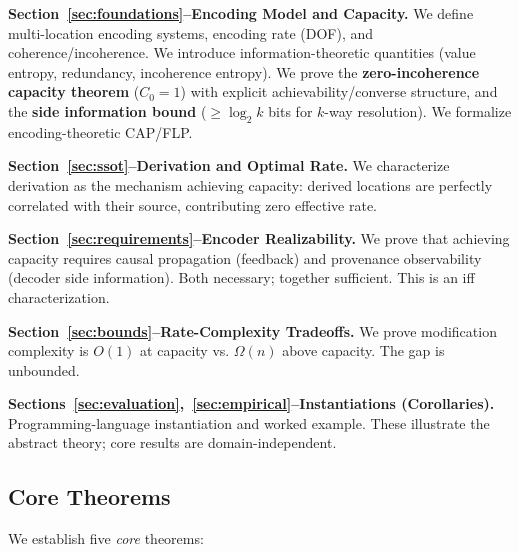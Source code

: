 \textbf{Section~\ref{sec:foundations}--Encoding Model and Capacity.} We define multi-location encoding systems, encoding rate (DOF), and coherence/incoherence. We introduce information-theoretic quantities (value entropy, redundancy, incoherence entropy). We prove the \textbf{zero-incoherence capacity theorem} ($C_0 = 1$) with explicit achievability/converse structure, and the \textbf{side information bound} ($\geq \log_2 k$ bits for $k$-way resolution). We formalize encoding-theoretic CAP/FLP.

\textbf{Section~\ref{sec:ssot}--Derivation and Optimal Rate.} We characterize derivation as the mechanism achieving capacity: derived locations are perfectly correlated with their source, contributing zero effective rate.

\textbf{Section~\ref{sec:requirements}--Encoder Realizability.} We prove that achieving capacity requires causal propagation (feedback) and provenance observability (decoder side information). Both necessary; together sufficient. This is an iff characterization.

\textbf{Section~\ref{sec:bounds}--Rate-Complexity Tradeoffs.} We prove modification complexity is $O(1)$ at capacity vs. $\Omega(n)$ above capacity. The gap is unbounded.

\textbf{Sections~\ref{sec:evaluation},~\ref{sec:empirical}--Instantiations (Corollaries).} Programming-language instantiation and worked example. These illustrate the abstract theory; core results are domain-independent.


\subsection{Core Theorems}\label{sec:core-theorems}

We establish five \emph{core} theorems:

